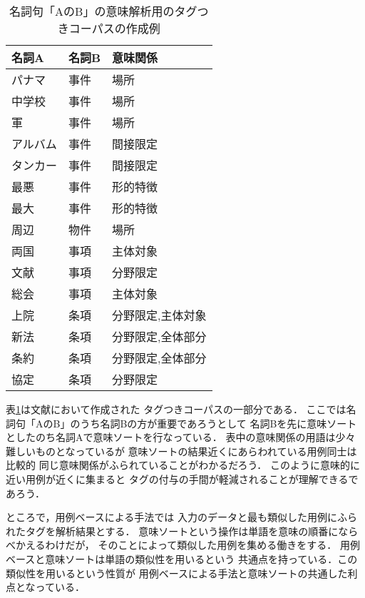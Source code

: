 \begin{table}[t]
  \caption{名詞句「AのB」の意味解析用のタグつきコーパスの作成例}
  \label{tab:make_corpus}
  \begin{center}
\small\renewcommand{\arraystretch}{}
\begin{tabular}[c]{|l|l|l|}\hline
名詞A       &   名詞B   &  意味関係       \\\hline
パナマ      &   事件    &       場所      \\
中学校      &   事件    &       場所      \\
軍          &   事件    &       場所      \\
アルバム    &   事件    &       間接限定  \\
タンカー    &   事件    &       間接限定  \\
最悪        &   事件    &       形的特徴  \\
最大        &   事件    &       形的特徴  \\
周辺        &   物件    &       場所      \\
両国        &   事項    &       主体対象  \\
文献        &   事項    &       分野限定  \\
総会        &   事項    &       主体対象  \\
上院        &   条項    &       分野限定,主体対象\\
新法        &   条項    &       分野限定,全体部分\\
条約        &   条項    &       分野限定,全体部分\\
協定        &   条項    &       分野限定  \\\hline
\end{tabular}
\end{center}
\end{table}

表\ref{tab:make_corpus}は文献\cite{yata_MT}において作成された
タグつきコーパスの一部分である．
ここでは名詞句「AのB」のうち名詞Bの方が重要であろうとして
名詞Bを先に意味ソートとしたのち名詞Aで意味ソートを行なっている．
表中の意味関係の用語は少々難しいものとなっているが
意味ソートの結果近くにあらわれている用例同士は比較的
同じ意味関係がふられていることがわかるだろう．
このように意味的に近い用例が近くに集まると
タグの付与の手間が軽減されることが理解できるであろう．

ところで，用例ベースによる手法では
入力のデータと最も類似した用例にふられたタグを解析結果とする．
意味ソートという操作は単語を意味の順番にならべかえるわけだが，
そのことによって類似した用例を集める働きをする．
用例ベースと意味ソートは単語の類似性を用いるという
共通点を持っている．この類似性を用いるという性質が
用例ベースによる手法と意味ソートの共通した利点となっている．

